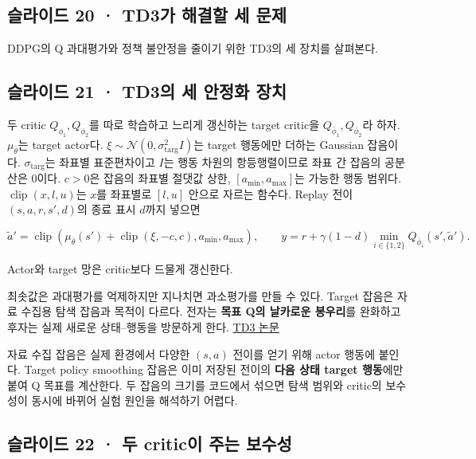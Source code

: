 \documentclass[11pt,a4paper]{article}
\begin{document}
\subsection{슬라이드 20 · TD3가 해결할 세 문제}

DDPG의 Q 과대평가와 정책 불안정을 줄이기 위한 TD3의 세 장치를 살펴본다.\par

\subsection{슬라이드 21 · TD3의 세 안정화 장치}

두 critic $Q_{\phi_1},Q_{\phi_2}$를 따로 학습하고 느리게 갱신하는 target critic을 $Q_{\bar\phi_1},Q_{\bar\phi_2}$라 하자. $\mu_{\bar\theta}$는 target actor다. $\xi\sim\mathcal N(0,\sigma_{\mathrm{targ}}^2I)$는 target 행동에만 더하는 Gaussian 잡음이다. $\sigma_{\mathrm{targ}}$는 좌표별 표준편차이고 $I$는 행동 차원의 항등행렬이므로 좌표 간 잡음의 공분산은 0이다. $c>0$은 잡음의 좌표별 절댓값 상한, $[a_{\min},a_{\max}]$는 가능한 행동 범위다. $\operatorname{clip}(x,l,u)$는 $x$를 좌표별로 $[l,u]$ 안으로 자르는 함수다. Replay 전이 $(s,a,r,s',d)$의 종료 표시 $d$까지 넣으면\par

\[
\tilde a'=\operatorname{clip}\!\left(\mu_{\bar\theta}(s')+
\operatorname{clip}(\xi,-c,c),a_{\min},a_{\max}\right),
\qquad
y=r+\gamma(1-d)\min_{i\in\{1,2\}}Q_{\bar\phi_i}(s',\tilde a').
\]

Actor와 target 망은 critic보다 드물게 갱신한다.\par

최솟값은 과대평가를 억제하지만 지나치면 과소평가를 만들 수 있다. Target 잡음은 자료 수집용 탐색 잡음과 목적이 다르다. 전자는 \textbf{목표 Q의 날카로운 봉우리}를 완화하고 후자는 실제 새로운 상태–행동을 방문하게 한다. \href{https://arxiv.org/abs/1802.09477}{TD3 논문}\par

자료 수집 잡음은 실제 환경에서 다양한 $(s,a)$ 전이를 얻기 위해 actor 행동에 붙인다. Target policy smoothing 잡음은 이미 저장된 전이의 \textbf{다음 상태 target 행동}에만 붙여 Q 목표를 계산한다. 두 잡음의 크기를 코드에서 섞으면 탐색 범위와 critic의 보수성이 동시에 바뀌어 실험 원인을 해석하기 어렵다.\par

\subsection{슬라이드 22 · 두 critic이 주는 보수성}
\end{document}
